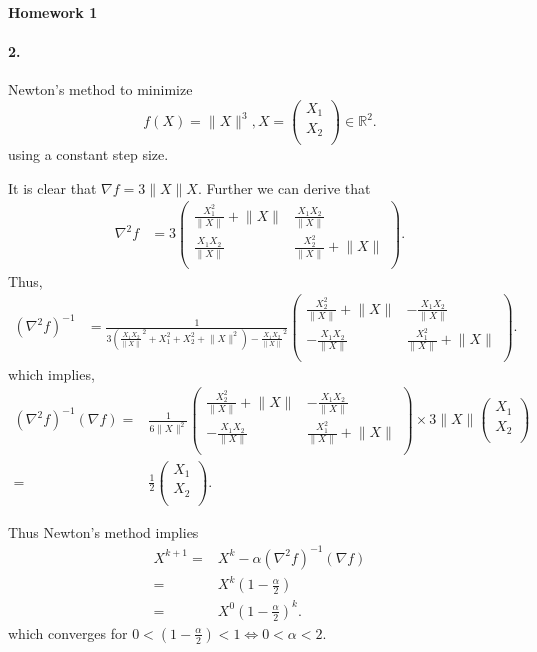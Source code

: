 \documentclass[12pt, leqno]{article}
\providecommand{\norm}[1]{\lVert#1\rVert}
\begin{document}

\pagestyle{fancy}

\begin{center}
{\large {\bf Homework 1}} \\
\end{center}

\paragraph{2.} Newton's method to minimize 
\[
f(X) = \norm{X}^3, X = \begin{pmatrix}
X_1\\ 
X_2\\ 
\end{pmatrix} \in\mathbb{R}^2.
\]
using a constant step size.

It is clear that $\nabla f = 3\norm{X}X.$
Further we can derive that 
\begin{align*}
\nabla^2 f  &=  3\begin{pmatrix}
\frac{X_1^2}{\norm{X}}+\norm{X}&\frac{X_1X_2}{\norm{X}}\\ 
\frac{X_1X_2}{\norm{X}}&\frac{X_2^2}{\norm{X}}+\norm{X}\\ 
\end{pmatrix}.
\end{align*}
Thus, 
\begin{align*}
(\nabla^2 f)^{-1}  &=  \frac{1}{3({\frac{X_1X_2}{\norm{X}}}^2 + X_1^2
                     + X_2^2 + \norm{X}^2) - {\frac{X_1X_2}{\norm{X}}}^2}\begin{pmatrix}
\frac{X_2^2}{\norm{X}}+\norm{X}&-\frac{X_1X_2}{\norm{X}}\\ 
-\frac{X_1X_2}{\norm{X}}&\frac{X_1^2}{\norm{X}}+\norm{X}\\ 
\end{pmatrix}.
\end{align*}
which implies,
\begin{align*}
  (\nabla^2 f)^{-1} (\nabla f) =& \frac{1}{6 \norm{X}^2}
\begin{pmatrix}
\frac{X_2^2}{\norm{X}}+\norm{X}&-\frac{X_1X_2}{\norm{X}}\\ 
-\frac{X_1X_2}{\norm{X}}&\frac{X_1^2}{\norm{X}}+\norm{X}\\ 
\end{pmatrix} \times 3\norm{X} \begin{pmatrix}
X_1\\ 
X_2\\ 
\end{pmatrix}
\\
=& \frac{1}{2} \begin{pmatrix}
X_1\\ 
X_2\\ 
\end{pmatrix}.
\end{align*}

Thus Newton's method implies 
\begin{align*}
X^{k+1} =& X^{k} - \alpha   (\nabla^2 f)^{-1} (\nabla f) \\
=& X^{k}( 1 - \frac{\alpha}{2})  \\ 
=& X^{0}( 1 - \frac{\alpha}{2})^k .
\end{align*}
which converges for $0<( 1 - \frac{\alpha}{2})<1 \iff 0<\alpha<2$.
\end{document}
